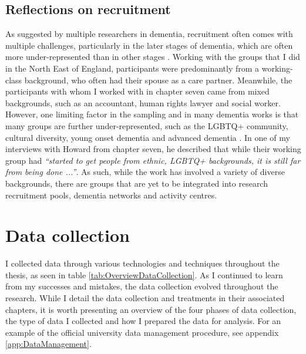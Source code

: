 \subsection{Reflections on recruitment}
As suggested by multiple researchers in dementia, recruitment often comes with multiple challenges, particularly in the later stages of dementia, which are often more under-represented than in other stages \citep{bartlett2019strategies}. Working with the groups that I did in the North East of England, participants were predominantly from a working-class background, who often had their spouse as a care partner. Meanwhile, the participants with whom I worked with in chapter seven came from mixed backgrounds, such as an accountant, human rights lawyer and social worker. 
However, one limiting factor in the sampling and in many dementia works is that many groups are further under-represented, such as the LGBTQ+ community, cultural diversity, young onset dementia and advanced dementia \citep{mcgovern2014forgotten}. In one of my interviews with Howard from chapter seven, he described that while their working group had \textit{``started to get people from ethnic, LGBTQ+ backgrounds, it is still far from being done ...''}. As such, while the work has involved a variety of diverse backgrounds, there are groups that are yet to be integrated into research recruitment pools, dementia networks and activity centres. 

\section{Data collection}
\label{Method:DataCollection}
I collected data through various technologies and techniques throughout the thesis, as seen in table \ref{tab:OverviewDataCollection}. As I continued to learn from my successes and mistakes, the data collection evolved throughout the research. While I detail the data collection and treatments in their associated chapters, it is worth presenting an overview of the four phases of data collection, the type of data I collected and how I prepared the data for analysis. For an example of the official university data management procedure, see appendix \ref{app:DataManagement}.

